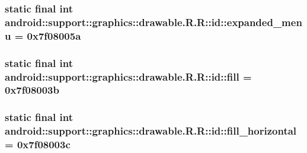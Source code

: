 \hypertarget{classandroid_1_1support_1_1graphics_1_1drawable_1_1_r_1_1id_3279d15f1de883c020b0bfaaeb9f4b2e}{
\subsubsection[{expanded\_\-menu}]{\setlength{\rightskip}{0pt plus 5cm}static final int android::support::graphics::drawable.R.R::id::expanded\_\-menu = 0x7f08005a}}
\label{classandroid_1_1support_1_1graphics_1_1drawable_1_1_r_1_1id_3279d15f1de883c020b0bfaaeb9f4b2e}


\hypertarget{classandroid_1_1support_1_1graphics_1_1drawable_1_1_r_1_1id_5c97c00a07a210f84b31ce3688f2ef6f}{
\subsubsection[{fill}]{\setlength{\rightskip}{0pt plus 5cm}static final int android::support::graphics::drawable.R.R::id::fill = 0x7f08003b}}
\label{classandroid_1_1support_1_1graphics_1_1drawable_1_1_r_1_1id_5c97c00a07a210f84b31ce3688f2ef6f}


\hypertarget{classandroid_1_1support_1_1graphics_1_1drawable_1_1_r_1_1id_3d2680b01ec511348004bd106801c94d}{
\subsubsection[{fill\_\-horizontal}]{\setlength{\rightskip}{0pt plus 5cm}static final int android::support::graphics::drawable.R.R::id::fill\_\-horizontal = 0x7f08003c}}
\label{classandroid_1_1support_1_1graphics_1_1drawable_1_1_r_1_1id_3d2680b01ec511348004bd106801c94d}


